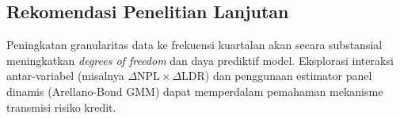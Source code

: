 \documentclass[12pt,a4paper]{article}
\begin{document}
\subsection{Rekomendasi Penelitian Lanjutan}

Peningkatan granularitas data ke frekuensi kuartalan akan secara substansial meningkatkan \textit{degrees of freedom} dan daya prediktif model. Eksplorasi interaksi antar-variabel (misalnya $\Delta\text{NPL} \times \Delta\text{LDR}$) dan penggunaan estimator panel dinamis (Arellano-Bond GMM) dapat memperdalam pemahaman mekanisme transmisi risiko kredit.
\end{document}
